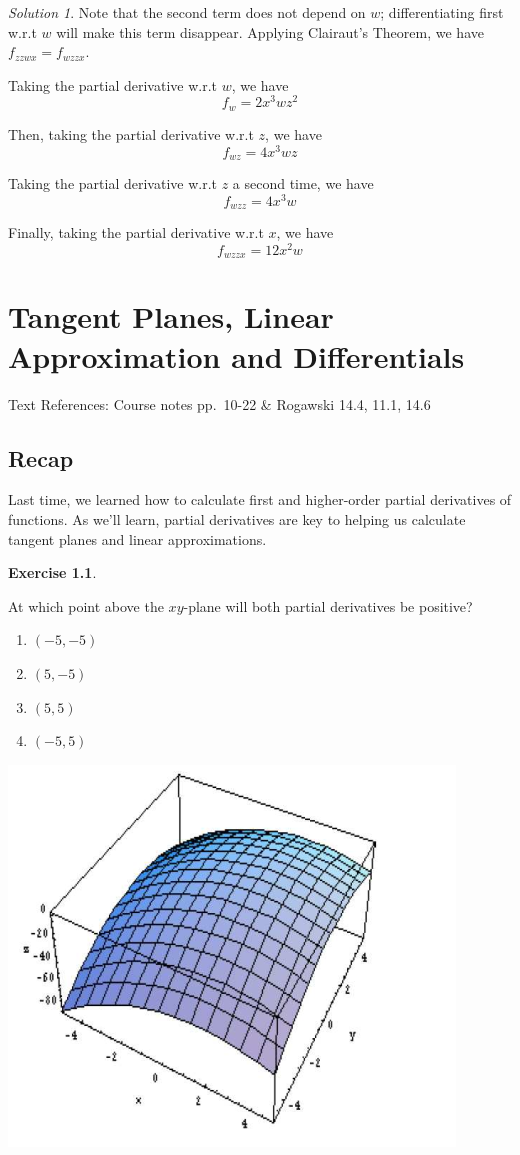 \documentclass[
]{book}
\providecommand{\tightlist}{%
  \setlength{\itemsep}{0pt}\setlength{\parskip}{0pt}}
\theoremstyle{definition}
\theoremstyle{definition}
\theoremstyle{definition}
\newtheorem{exercise}{Exercise}[chapter]
\theoremstyle{definition}
\theoremstyle{remark}
\newtheorem*{solution}{Solution}
\begin{document}
\begin{solution}

Note that the second term does not depend on \(w\); differentiating first w.r.t \(w\) will make this term disappear. Applying Clairaut's Theorem, we have \(f_{zzwx}=f_{wzzx}\).

Taking the partial derivative w.r.t \(w\), we have \[f_w = 2x^3wz^2\]

Then, taking the partial derivative w.r.t \(z\), we have \[f_{wz}=4x^3wz\]

Taking the partial derivative w.r.t \(z\) a second time, we have \[f_{wzz}=4x^3w\]

Finally, taking the partial derivative w.r.t \(x\), we have \[f_{wzzx} =12x^2w \]

\end{solution}

\hypertarget{lec-4}{%
\chapter{Tangent Planes, Linear Approximation and Differentials}\label{lec-4}}

Text References: Course notes pp.~10-22 \& Rogawski 14.4, 11.1, 14.6

\hypertarget{recap-2}{%
\section{Recap}\label{recap-2}}

Last time, we learned how to calculate first and higher-order partial derivatives of functions. As we'll learn, partial derivatives are key to helping us calculate tangent planes and linear approximations.

\begin{exercise}
\protect\hypertarget{exr:unlabeled-div-22}{}\label{exr:unlabeled-div-22}

At which point above the \(xy\)-plane will both partial derivatives be positive?

\begin{enumerate}
\def\labelenumi{\alph{enumi}.}
\tightlist
\item
  \((-5, -5)\)
\item
  \((5, -5)\)
\item
  \((5, 5)\)
\item
  \((-5, 5)\)
\end{enumerate}

\begin{center}\includegraphics[width=0.5\linewidth]{images/l4-recap} \end{center}

\end{exercise}
\end{document}
